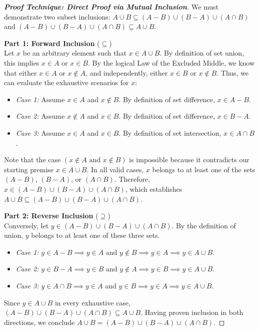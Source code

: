 \documentclass[11pt]{article}
\begin{document}
\begin{proof}[\textbf{Proof Technique: Direct Proof via Mutual Inclusion}]
We must demonstrate two subset inclusions: $A \cup B \subseteq (A - B) \cup (B - A) \cup (A \cap B)$ and $(A - B) \cup (B - A) \cup (A \cap B) \subseteq A \cup B$.

\textbf{Part 1: Forward Inclusion} ($\subseteq$) \\
Let $x$ be an arbitrary element such that $x \in A \cup B$. 
By definition of set union, this implies $x \in A$ or $x \in B$. 
By the logical Law of the Excluded Middle, we know that either $x \in A$ or $x \notin A$, and independently, either $x \in B$ or $x \notin B$. Thus, we can evaluate the exhaustive scenarios for $x$:
\begin{itemize}
    \item \textit{Case 1:} Assume $x \in A$ and $x \notin B$. By definition of set difference, $x \in A - B$.
    \item \textit{Case 2:} Assume $x \notin A$ and $x \in B$. By definition of set difference, $x \in B - A$.
    \item \textit{Case 3:} Assume $x \in A$ and $x \in B$. By definition of set intersection, $x \in A \cap B$.
\end{itemize}
Note that the case $(x \notin A \text{ and } x \notin B)$ is impossible because it contradicts our starting premise $x \in A \cup B$. In all valid cases, $x$ belongs to at least one of the sets $(A - B)$, $(B - A)$, or $(A \cap B)$. 
Therefore, $x \in (A - B) \cup (B - A) \cup (A \cap B)$, which establishes $A \cup B \subseteq (A - B) \cup (B - A) \cup (A \cap B)$.

\textbf{Part 2: Reverse Inclusion} ($\supseteq$) \\
Conversely, let $y \in (A - B) \cup (B - A) \cup (A \cap B)$. 
By the definition of union, $y$ belongs to at least one of these three sets.
\begin{itemize}
    \item \textit{Case 1:} $y \in A - B \implies y \in A$ and $y \notin B \implies y \in A \implies y \in A \cup B$.
    \item \textit{Case 2:} $y \in B - A \implies y \in B$ and $y \notin A \implies y \in B \implies y \in A \cup B$.
    \item \textit{Case 3:} $y \in A \cap B \implies y \in A$ and $y \in B \implies y \in A \implies y \in A \cup B$.
\end{itemize}
Since $y \in A \cup B$ in every exhaustive case, $(A - B) \cup (B - A) \cup (A \cap B) \subseteq A \cup B$.
Having proven inclusion in both directions, we conclude $A \cup B = (A - B) \cup (B - A) \cup (A \cap B)$.
\end{proof}
\end{document}
